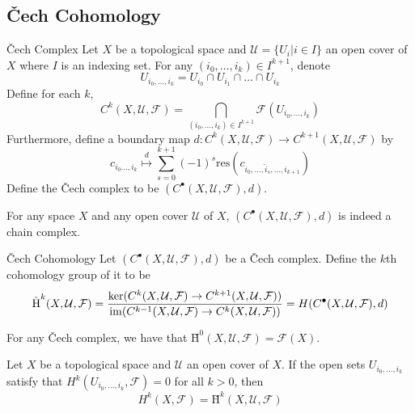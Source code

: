 \documentclass[a4paper]{article}
\begin{document}
\subsection{\v{C}ech Cohomology}
\begin{defn}{\v{C}ech Complex}{} Let $X$ be a topological space and $\mathcal{U}=\{U_i|i\in I\}$ an open cover of $X$ where $I$ is an indexing set. For any $(i_0,\dots,i_k)\in I^{k+1}$, denote $$U_{i_0,\dots,i_k}=U_{i_0}\cap U_{i_1}\cap\dots\cap U_{i_k}$$ Define for each $k$, $$C^k(X,\mathcal{U},\mathcal{F})=\bigcap_{(i_0,\dots,i_k)\in I^{k+1}}\mathcal{F}(U_{i_0,\dots,i_k})$$ Furthermore, define a boundary map $d:C^k(X,\mathcal{U},\mathcal{F})\to C^{k+1}(X,\mathcal{U},\mathcal{F})$ by $$c_{i_0\dots,i_k}\overset{d}{\mapsto}\sum_{s=0}^{k+1}(-1)^s\text{res}(c_{i_0,\dots,\hat{i}_s,\dots,i_{k+1}})$$ Define the \v{C}ech complex to be $(C^\bullet(X,\mathcal{U},\mathcal{F}),d)$. 
\end{defn}

\begin{lmm}{}{} For any space $X$ and any open cover $\mathcal{U}$ of $X$, $(C^\bullet(X,\mathcal{U},\mathcal{F}),d)$ is indeed a chain complex. 
\end{lmm}

\begin{defn}{\v{C}ech Cohomology}{} Let $(C^\bullet(X,\mathcal{U},\mathcal{F}),d)$ be a \v{C}ech complex. Define the $k$th cohomology group of it to be $$\text{\v{H}}^k(X,\mathcal{U},\mathcal{F})=\frac{\ker(C^k(X,\mathcal{U},\mathcal{F})\to C^{k+1}(X,\mathcal{U},\mathcal{F}))}{\im(C^{k-1}(X,\mathcal{U},\mathcal{F})\to C^k(X,\mathcal{U},\mathcal{F}))}=H(C^\bullet(X,\mathcal{U},\mathcal{F}),d)$$
\end{defn}

\begin{lmm}{}{} For any \v{C}ech complex, we have that $\text{\v{H}}^0(X,\mathcal{U},\mathcal{F})=\mathcal{F}(X)$. 
\end{lmm}

\begin{thm}{}{} Let $X$ be a topological space and $\mathcal{U}$ an open cover of $X$. If the open sets $U_{i_0,\dots,i_k}$ satisfy that $H^k(U_{i_0,\dots,i_k},\mathcal{F})=0$ for all $k>0$, then $$H^k(X,\mathcal{F})=\text{\v{H}}^k(X,\mathcal{U},\mathcal{F})$$
\end{thm}
\end{document}
